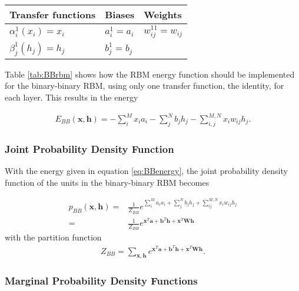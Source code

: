 \begin{table*}\centering
{}
\caption{This table shows how the terms in the restricted Boltzmann machine (RBM) energy function (equation \ref{eq:RBMenergy}) should be implemented in order to yield the binary-binary restricted boltzmann machine, that is an RBM where both visible and hidden units take binary values. }
\label{tab:BBrbm}
\begin{tabular}{lll}
\toprule
\toprule
Transfer functions & Biases & Weights \\ 
\midrule 
$\alpha_i^1 (x_i) = x_i$ & $a_i^1 = a_i$  & $w_{ij}^{11} = w_{ij}$ \\
$\beta_j^1 (h_j) = h_j$  & $b_j^1 = b_j$  &  \\
\bottomrule
\bottomrule
\end{tabular}
\end{table*}

Table \ref{tab:BBrbm} shows how the RBM energy function should be implemented for the binary-binary RBM, using only one transfer function, the identity, for each layer. This results in the energy

\begin{align}
	E_{BB}(\bm{x}, \mathbf{h}) = - \sum_i^M x_i a_i- \sum_j^N b_j h_j - \sum_{i,j}^{M,N} x_i w_{ij} h_j.
	\label{eq:BBenergy}
\end{align}


\subsubsection{Joint Probability Density Function}

With the energy given in equation \ref{eq:BBenergy}, the joint probability density function of the units in the binary-binary RBM becomes

\begin{align}
	p_{BB}(\bm{x}, \bm{h}) =& \frac{1}{Z_{BB}} e^{\sum_i^M a_i x_i + \sum_j^N b_j h_j + \sum_{ij}^{M,N} x_i w_{ij} h_j} \\
	=& \frac{1}{Z_{BB}} e^{\bm{x}^T \bm{a} + \bm{b}^T \bm{h} + \bm{x}^T \bm{W} \bm{h}}
\end{align}
with the partition function
\begin{align}
	Z_{BB} = \sum_{\bm{x}, \bm{h}} e^{\bm{x}^T \bm{a} + \bm{b}^T \bm{h} + \bm{x}^T \bm{W} \bm{h}} .
\end{align}

\subsubsection{Marginal Probability Density Functions}

